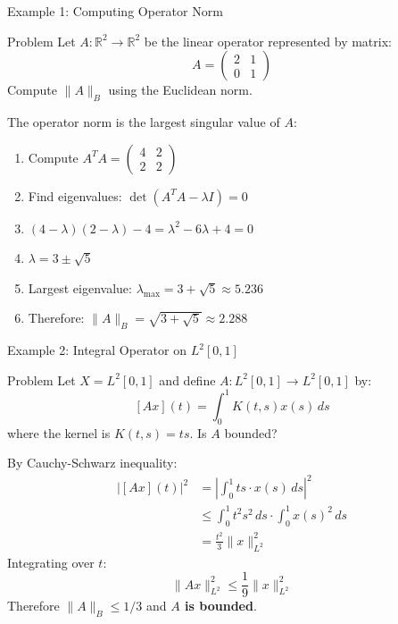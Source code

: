 \documentclass[aspectratio=169,10pt]{beamer}
\begin{document}
\begin{frame}[fragile]{Example 1: Computing Operator Norm}
    \begin{block}{Problem}
        Let $A : \mathbb{R}^2 \to \mathbb{R}^2$ be the linear operator represented by matrix:
        $$A = \begin{pmatrix} 2 & 1 \\ 0 & 1 \end{pmatrix}$$
        Compute $\|A\|_B$ using the Euclidean norm.
    \end{block}

    \vspace{0.3cm}

    \begin{solution}
        The operator norm is the largest singular value of $A$:
        \begin{enumerate}
            \item Compute $A^T A = \begin{pmatrix} 4 & 2 \\ 2 & 2 \end{pmatrix}$
            \item Find eigenvalues: $\det(A^T A - \lambda I) = 0$
            \item $(4-\lambda)(2-\lambda) - 4 = \lambda^2 - 6\lambda + 4 = 0$
            \item $\lambda = 3 \pm \sqrt{5}$
            \item Largest eigenvalue: $\lambda_{\max} = 3 + \sqrt{5} \approx 5.236$
            \item Therefore: $\|A\|_B = \sqrt{3 + \sqrt{5}} \approx 2.288$
        \end{enumerate}
    \end{solution}
\end{frame}

\begin{frame}[fragile]{Example 2: Integral Operator on $L^2[0,1]$}
    \begin{block}{Problem}
        Let $X = L^2[0,1]$ and define $A : L^2[0,1] \to L^2[0,1]$ by:
        $$[Ax](t) = \int_0^1 K(t,s) x(s) \, ds$$
        where the kernel is $K(t,s) = ts$. Is $A$ bounded?
    \end{block}

    \vspace{0.3cm}

    \begin{solution}
        By Cauchy-Schwarz inequality:
        \begin{align*}
            |[Ax](t)|^2 &= \left|\int_0^1 ts \cdot x(s) \, ds\right|^2 \\
            &\leq \int_0^1 t^2 s^2 \, ds \cdot \int_0^1 x(s)^2 \, ds \\
            &= \frac{t^2}{3} \|x\|^2_{L^2}
        \end{align*}
        Integrating over $t$:
        \[\|Ax\|^2_{L^2} \leq \frac{1}{9} \|x\|^2_{L^2}\]
        Therefore $\|A\|_B \leq 1/3$ and \textbf{$A$ is bounded}.
    \end{solution}
\end{frame}
\end{document}
